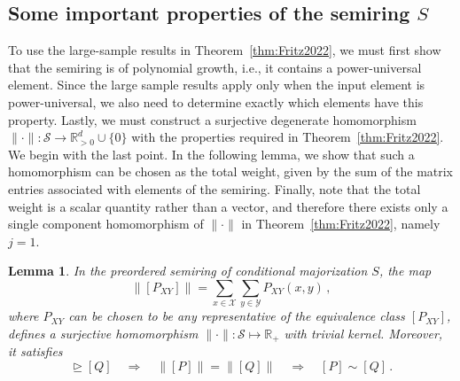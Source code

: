\documentclass[aps,pra,11pt,onecolumn,nofootinbib,tightenlines]{revtex4-2}
\newtheorem{lemma}[theorem]{Lemma}
\theoremstyle{definition}
\newcommand{\cS}{\mathcal{S}}
\newcommand{\R}{\mathbb{R}}
\newcommand{\mc}[1]{\mathcal{#1}}
\newcommand{\rgeq}{\trianglerighteq}
\begin{document}
\subsection{Some important properties of the semiring \texorpdfstring{$S$}{S}}
To use the large-sample results in Theorem~\ref{thm:Fritz2022}, we must first show that the semiring is of polynomial growth, i.e., it contains a power-universal element. Since the large sample results apply only when the input element is power-universal, we also need to determine exactly which elements have this property. Lastly, we must construct a surjective degenerate homomorphism $\|\cdot\|:\cS\to\R_{>0}^d\cup\{0\}$ with the properties required in Theorem~\ref{thm:Fritz2022}. We begin with the last point. In the following lemma, we show that such a homomorphism can be chosen as the total weight, given by the sum of the matrix entries associated with elements of the semiring.
Finally, note that the total weight is a scalar quantity rather than a vector, and therefore there exists only a single component homomorphism of \(\|\cdot\|\) in Theorem~\ref{thm:Fritz2022}, namely \(j = 1\).
\begin{lemma}
\label{lem: degenerate and zig-zag}
In the preordered semiring of conditional majorization $S$, the map
\begin{equation}
\|[P_{XY}]\| = \sum_{x\in\mc X}\sum_{y\in\mc Y} P_{XY}(x,y) \,,
\end{equation}
where $P_{XY}$ can be chosen to be any representative of the equivalence class $[P_{XY}]$,
defines a surjective homomorphism $\|\cdot\| : \cS \mapsto \mathbb{R}_+$ with trivial kernel. Moreover, it satisfies
\begin{equation}
[P] \rgeq [Q] \quad \Rightarrow \quad \|[P]\| = \|[Q]\| \quad \Rightarrow\quad  [P] \sim [Q]\,.
\end{equation}
\end{lemma}
\end{document}
